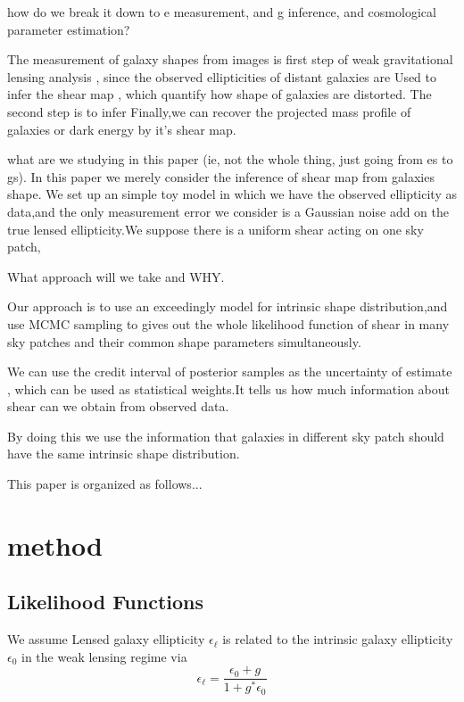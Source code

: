 \documentclass[useAMS,usenatbib]{mn2e}
\begin{document}
how do we break it down to e measurement, and g inference, and cosmological parameter estimation?

The measurement of galaxy shapes from images is first step  of weak gravitational lensing analysis , since the observed ellipticities of distant galaxies are
Used to infer the shear map , which quantify how shape of galaxies are distorted.
The second step is to infer 
Finally,we can recover the projected mass profile of galaxies or dark energy by it’s shear map.

what are we studying in this paper (ie, not the whole thing, just going from es to gs).
In this paper we merely consider the inference of shear map from galaxies shape.
We set up an simple toy model in which we have the observed ellipticity as data,and the only measurement error we consider 
is a Gaussian noise add on the true lensed ellipticity.We suppose there is a uniform shear acting on one sky patch,



What approach will we take and WHY.

Our approach is to use an exceedingly model for intrinsic shape distribution,and use MCMC sampling to 
gives out the whole likelihood function of shear in many sky patches and their common shape parameters simultaneously.

We can use the credit interval of posterior samples as the uncertainty of estimate
, which can be used as statistical weights.It tells us how much information about shear can we obtain from observed data.

By doing this we use the information that galaxies in different sky patch should have the same intrinsic shape distribution.


This paper is organized as follows...



\section{method}
\label{sec:XXX}

\subsection{Likelihood Functions}

We assume Lensed galaxy ellipticity $\epsilon_{\ell}$ is related
to the intrinsic galaxy ellipticity $\epsilon_{0}$ in the weak lensing
regime via
\begin{equation}
\epsilon_{\ell}=\frac{\epsilon_{0}+g}{1+g^{*}\epsilon_{0}}
\end{equation}
\end{document}
